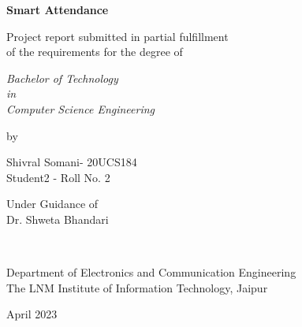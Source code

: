 \thispagestyle{empty}
\begin{center}
{\Large \bf Smart Attendance }


\vspace*{1.75cm}
{\large Project report submitted in partial fulfillment\\}
{\large  of the requirements for the degree of \\}

\vspace*{1cm}
{\it {\large Bachelor of Technology} \\
{\large in\\}
{\large Computer Science Engineering \\}}

\vspace*{1cm}
{\large by}

\vspace*{1cm}
{\large Shivral Somani- 20UCS184\\}
{\large Student2 - Roll No.  2 \\}


\vspace*{5mm}
{\large Under Guidance of \\}
{\large Dr. Shweta Bhandari  \\}

\vspace*{1.0cm}
{\\}

\vspace*{2.0cm}
{\large Department of Electronics and Communication Engineering \\}
{\large The LNM Institute of Information Technology, Jaipur\\}

\vspace*{1.0cm}
{\large April 2023\\}
\end{center}

\clearpage
